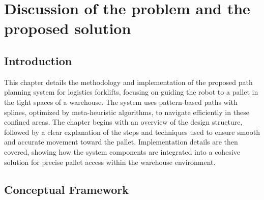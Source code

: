 \chapter{Discussion of the problem and the
proposed solution
}

\renewcommand{\chaptername}{Chapter}
\section*{Introduction}

This chapter details the methodology and implementation of the proposed path planning system for logistics forklifts, 
focusing on guiding the robot to a pallet in the tight spaces of a warehouse. The system uses pattern-based paths with 
splines, optimized by meta-heuristic algorithms, to navigate efficiently in these confined areas. The chapter begins with 
an overview of the design structure, followed by a clear explanation of the steps and techniques used to ensure 
smooth and accurate movement toward the pallet. Implementation details are then covered, showing how the system 
components are integrated into a cohesive solution for precise pallet access within the warehouse environment.

\section{Conceptual Framework}
